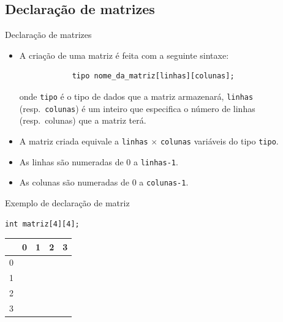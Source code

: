 \documentclass[handout]{beamer}
\newcommand{\cod}[1]{\texttt{#1}}
\begin{document}

\subsection{Declaração de matrizes}

\begin{frame}[fragile]{Declaração de matrizes}

    \begin{itemize}
        \item A criação de uma matriz é feita com a seguinte sintaxe:

        \begin{verbatim}
            tipo nome_da_matriz[linhas][colunas];
        \end{verbatim}
        onde \cod{tipo} é o tipo de dados que a matriz armazenará, \cod{linhas} (resp.\ \cod{colunas}) é um inteiro que especifica o número de linhas (resp.\ colunas) que a matriz terá.

        \item A matriz criada equivale a \cod{linhas} $\times$ \cod{colunas} variáveis do tipo \cod{tipo}.
        \item As linhas são numeradas de 0 a \cod{linhas-1}.
        \item As colunas são numeradas de 0 a \cod{colunas-1}.
    \end{itemize}

\end{frame}

\begin{frame}[fragile]{Exemplo de declaração de matriz}

    \cod{int matriz[4][4];}

    \vspace{20pt}

    \begin{center}
        \begin{tabular}{|l|c|c|c|c|}
          \cline{2-5}
          \multicolumn{1}{l|}{}
            & 0 & 1 & 2 & 3 \\ \hline
          0 &   &   &   &   \\ \hline
          1 &   &   &   &   \\ \hline
          2 &   &   &   &   \\ \hline
          3 &   &   &   &   \\ \hline
        \end{tabular}
    \end{center}

\end{frame}
\end{document}
